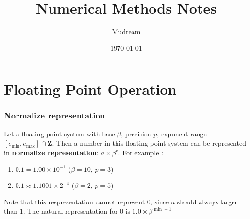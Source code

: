 \documentclass{article}
\title{Numerical Methods Notes}
\author{Mudream}
\date{\today}
\begin{document}
    \maketitle
    \part{Floating Point Operation}
        \section{Normalize representation}

        Let a floating point system with base $\beta$, precision $p$, 
        exponent range $[e_{\min}, e_{\max}]\cap\textbf{Z}$. Then a number in this 
        floating point system can be represented in 
        \textbf{normalize representation}: $a \times \beta^c$.
        For example : 
        
        \begin{enumerate}
            \item $0.1 = 1.00 \times 10^{-1}$ ($\beta = 10$, $p = 3$)
            \item $0.1 \approx 1.1001 \times 2^{-4}$ ($\beta = 2$, $p = 5$)
        \end{enumerate}

        Note that this respresentation cannot represent $0$,
        since $a$ should always larger than $1$.
        The natural representation for $0$ is $1.0 \times \beta^{\min - 1}$
        
\end{document}

